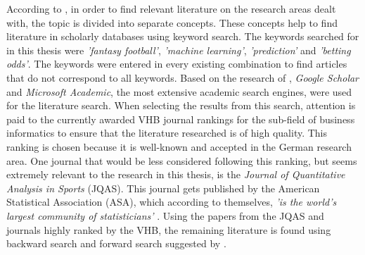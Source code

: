 According to \citet{vom_brocke_standing_2015}, in order to find relevant literature on the research areas dealt with, the topic is divided into separate concepts. These concepts help to find literature in scholarly databases using keyword search. The keywords searched for in this thesis were \emph{'fantasy football'}, \emph{'machine learning'}, \emph{'prediction'} and \emph{'betting odds'}. The keywords were entered in every existing combination to find articles that do not correspond to all keywords. Based on the research of \citet{gusenbauer_google_2019}, \emph{Google Scholar} and \emph{Microsoft Academic}, the most extensive academic search engines, were used for the literature search. When selecting the results from this search, attention is paid to the currently awarded VHB journal rankings \parencite[see][]{vhb_e_v_vhb-jourqual3_2015} for the sub-field of business informatics to ensure that the literature researched is of high quality. This ranking is chosen because it is well-known and accepted in the German research area. One journal that would be less considered following this ranking, but seems extremely relevant to the research in this thesis, is the \emph{Journal of Quantitative Analysis in Sports} (JQAS). This journal gets published by the American Statistical Association (ASA), which according to themselves, \emph{'is the world's largest community of statisticians'} \parencite[see][]{noauthor_about_nodate}. Using the papers from the JQAS and journals highly ranked by the VHB, the remaining literature is found using backward search and forward search suggested by \citet{webster_guest_2002}.


